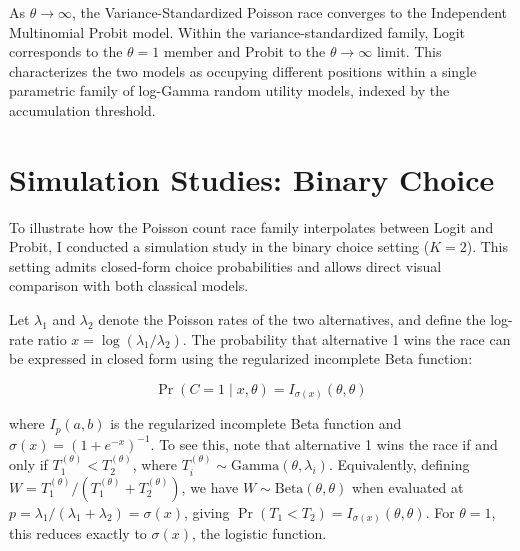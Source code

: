 \documentclass[
  man,
  floatsintext,
  longtable,
  a4paper,
  nolmodern,
  notxfonts,
  notimes,
  colorlinks=true,linkcolor=blue,citecolor=blue,urlcolor=blue]{apa7}
\begin{document}
\begin{tcolorbox}[enhanced jigsaw, colbacktitle=quarto-callout-note-color!10!white, bottomtitle=1mm, colback=white, arc=.35mm, coltitle=black, bottomrule=.15mm, breakable, toptitle=1mm, titlerule=0mm, colframe=quarto-callout-note-color-frame, toprule=.15mm, title={Result 3 (Probit Limit)}, rightrule=.15mm, left=2mm, leftrule=.75mm, opacityback=0, opacitybacktitle=0.6]

As \(\theta \to \infty\), the Variance-Standardized Poisson race
converges to the Independent Multinomial Probit model. Within the
variance-standardized family, Logit corresponds to the \(\theta=1\)
member and Probit to the \(\theta \to \infty\) limit. This characterizes
the two models as occupying different positions within a single
parametric family of log-Gamma random utility models, indexed by the
accumulation threshold.

\end{tcolorbox}

\section{Simulation Studies: Binary
Choice}\label{simulation-studies-binary-choice}

To illustrate how the Poisson count race family interpolates between
Logit and Probit, I conducted a simulation study in the binary choice
setting (\(K=2\)). This setting admits closed-form choice probabilities
and allows direct visual comparison with both classical models.

Let \(\lambda_1\) and \(\lambda_2\) denote the Poisson rates of the two
alternatives, and define the log-rate ratio
\(x = \log(\lambda_1/\lambda_2)\). The probability that alternative 1
wins the race can be expressed in closed form using the regularized
incomplete Beta function:

\[
\Pr(C = 1 \mid x, \theta) = I_{\sigma(x)}(\theta, \theta)
\]

where \(I_p(a, b)\) is the regularized incomplete Beta function and
\(\sigma(x) = (1 + e^{-x})^{-1}\). To see this, note that alternative 1
wins the race if and only if \(T_1^{(\theta)} < T_2^{(\theta)}\), where
\(T_i^{(\theta)} \sim \text{Gamma}(\theta, \lambda_i)\). Equivalently,
defining \(W = T_1^{(\theta)} / (T_1^{(\theta)} + T_2^{(\theta)})\), we
have \(W \sim \text{Beta}(\theta, \theta)\) when evaluated at
\(p = \lambda_1 / (\lambda_1 + \lambda_2) = \sigma(x)\), giving
\(\Pr(T_1 < T_2) = I_{\sigma(x)}(\theta, \theta)\). For \(\theta = 1\),
this reduces exactly to \(\sigma(x)\), the logistic function.
\end{document}
